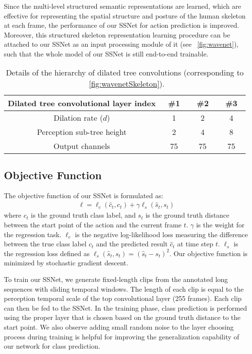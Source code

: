 \documentclass[10pt,twocolumn,letterpaper]{article}
\begin{document}
Since the multi-level structured semantic representations are learned,
which are effective for representing the spatial structure and posture of the human skeleton at each frame,
the performance of our SSNet for action prediction is improved.
Moreover, this structured skeleton representation learning procedure can be attached to our SSNet as an input processing module of it (see \figurename{~\ref{fig:wavenet}}),
such that the whole model of our SSNet is still end-to-end trainable.

\begin{table}[!tp]
\caption{Details of the hierarchy of dilated tree convolutions (corresponding to \figurename{~\ref{fig:wavenetSkeleton}}).}
\label{table:wavenetSkeletonDetails}
\centering
\small
\begin{tabular}{cccc}
\toprule
Dilated tree convolutional layer index   &   ~\#1~  &   ~\#2~ & ~\#3~   \\
\midrule
Dilation rate ($d$)                    &     1    &     2   &   4  \\
Perception sub-tree height                   &     2    &     4   &   8   \\
Output channels                          &    75    &     75  &  75   \\
\bottomrule
\end{tabular}
\end{table}

\subsection{Objective Function}

The objective function of our SSNet is formulated as:
\begin{eqnarray}
\label{eq:objfunc}
\ell= \ell_{c}(\hat{c}_{t},c_t) + \gamma \ell_{s}(\hat{s}_{t},s_t)
\end{eqnarray}
where $c_t$ is the ground truth class label, and $s_t$ is the ground truth distance between the start point of the action and the current frame $t$.
$\gamma$ is the weight for the regression task.
$\ell_{c}$ is the negative log-likelihood loss measuring the difference between the true class label $c_t$ and the predicted result $\hat{c}_{t}$ at time step $t$.
$\ell_{s}$ is the regression loss defined as $\ell_{s}(\hat{s}_{t},s_t)=(\hat{s}_{t}-s_t)^2$.
Our objective function is minimized by stochastic gradient descent.

To train our SSNet, we generate fixed-length clips from the annotated long sequences with sliding temporal windows.
The length of each clip is equal to the perception temporal scale of the top convolutional layer (255 frames).
Each clip can then be fed to the SSNet.
In the training phase,
class prediction is performed using the proper layer that is chosen based on the ground truth distance to the start point.
We also observe adding small random noise to the layer choosing process during training is helpful for improving the generalization capability of our network for class prediction.
\end{document}
